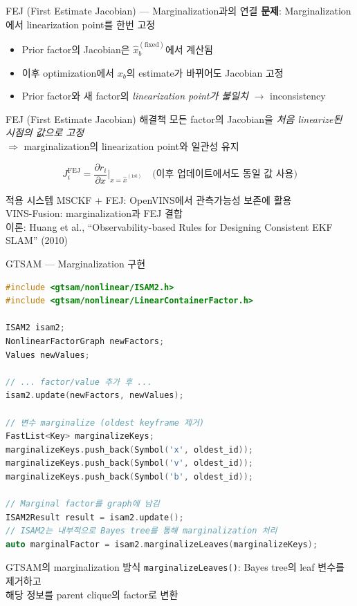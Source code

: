 \begin{frame}{FEJ (First Estimate Jacobian) — Marginalization과의 연결}
  \textbf{문제}: Marginalization에서 linearization point를 한번 고정
  \begin{itemize}
    \item Prior factor의 Jacobian은 $\hat{x}_b^{(\mathrm{fixed})}$에서 계산됨
    \item 이후 optimization에서 $x_b$의 estimate가 바뀌어도 Jacobian 고정
    \item Prior factor와 새 factor의 \emph{linearization point가 불일치} $\to$ inconsistency
  \end{itemize}
  \pause
  \begin{block}{FEJ (First Estimate Jacobian) 해결책}
    모든 factor의 Jacobian을 \emph{처음 linearize된 시점의 값으로 고정}\\
    $\Rightarrow$ marginalization의 linearization point와 일관성 유지
  \end{block}
  \pause
  \[
    J_i^{\mathrm{FEJ}} = \frac{\partial r_i}{\partial x}\Bigg|_{x = \hat{x}^{(1\mathrm{st})}}
    \quad \text{(이후 업데이트에서도 동일 값 사용)}
  \]
  \pause
  \begin{exampleblock}{적용 시스템}
    MSCKF + FEJ: OpenVINS에서 관측가능성 보존에 활용\\
    VINS-Fusion: marginalization과 FEJ 결합\\
    이론: Huang et al., ``Observability-based Rules for Designing Consistent EKF SLAM'' (2010)
  \end{exampleblock}
\end{frame}

\begin{frame}[fragile, shrink=15]{GTSAM — Marginalization 구현}
  \begin{lstlisting}[language=C++]
#include <gtsam/nonlinear/ISAM2.h>
#include <gtsam/nonlinear/LinearContainerFactor.h>

ISAM2 isam2;
NonlinearFactorGraph newFactors;
Values newValues;

// ... factor/value 추가 후 ...
isam2.update(newFactors, newValues);

// 변수 marginalize (oldest keyframe 제거)
FastList<Key> marginalizeKeys;
marginalizeKeys.push_back(Symbol('x', oldest_id));
marginalizeKeys.push_back(Symbol('v', oldest_id));
marginalizeKeys.push_back(Symbol('b', oldest_id));

// Marginal factor를 graph에 남김
ISAM2Result result = isam2.update();
// ISAM2는 내부적으로 Bayes tree를 통해 marginalization 처리
auto marginalFactor = isam2.marginalizeLeaves(marginalizeKeys);
  \end{lstlisting}
  \begin{block}{GTSAM의 marginalization 방식}
    \texttt{marginalizeLeaves()}: Bayes tree의 leaf 변수를 제거하고\\
    해당 정보를 parent clique의 factor로 변환
  \end{block}
\end{frame}

